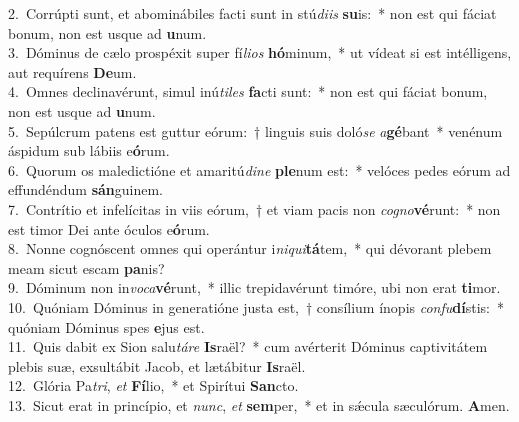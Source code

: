 {2.~}Corrúpti sunt, et abominábiles facti sunt in stú\textit{di}\textit{is} \textbf{su}is:~* non est qui fáciat bonum, non est usque ad \textbf{u}num.\\
{3.~}Dóminus de cælo prospéxit super fí\textit{li}\textit{os} \textbf{hó}minum,~* ut vídeat si est intélligens, aut requírens \textbf{De}um.\\
{4.~}Omnes declinavérunt, simul inú\textit{ti}\textit{les} \textbf{fa}cti sunt:~* non est qui fáciat bonum, non est usque ad \textbf{u}num.\\
{5.~}Sepúlcrum patens est guttur eórum:~† linguis suis doló\textit{se} \textit{a}\textbf{gé}bant~* venénum áspidum sub lábiis e\textbf{ó}rum.\\
{6.~}Quorum os maledictióne et amaritú\textit{di}\textit{ne} \textbf{ple}num est:~* velóces pedes eórum ad effundéndum \textbf{sán}guinem.\\
{7.~}Contrítio et infelícitas in viis eórum,~† et viam pacis non \textit{co}\textit{gno}\textbf{vé}runt:~* non est timor Dei ante óculos e\textbf{ó}rum.\\
{8.~}Nonne cognóscent omnes qui operántur i\textit{ni}\textit{qui}\textbf{tá}tem,~* qui dévorant plebem meam sicut escam \textbf{pa}nis?\\
{9.~}Dóminum non in\textit{vo}\textit{ca}\textbf{vé}runt,~* illic trepidavérunt timóre, ubi non erat \textbf{ti}mor.\\
{10.~}Quóniam Dóminus in generatióne justa est,~† consílium ínopis \textit{con}\textit{fu}\textbf{dí}stis:~* quóniam Dóminus spes \textbf{e}jus est.\\
{11.~}Quis dabit ex Sion salu\textit{tá}\textit{re} \textbf{Is}raël?~* cum avérterit Dóminus captivitátem plebis suæ, exsultábit Jacob, et lætábitur \textbf{Is}raël.\\
{12.~}Glória Pa\textit{tri}, \textit{et} \textbf{Fí}lio,~* et Spirítui \textbf{San}cto.\\
{13.~}Sicut erat in princípio, et \textit{nunc}, \textit{et} \textbf{sem}per,~* et in sǽcula sæculórum. \textbf{A}men.\\
